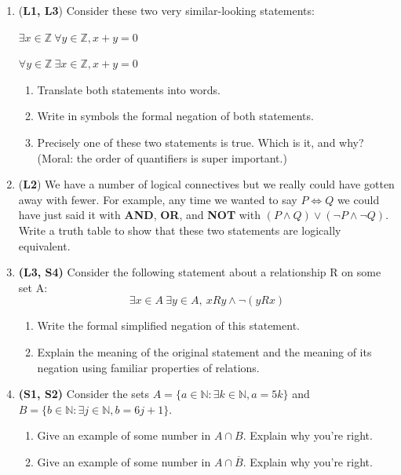 \documentclass[12pt]{article}
\begin{document}
\begin{enumerate}
\item (\textbf{L1, L3}) Consider these two very similar-looking statements: 

$\exists x\in \mathbb{Z}\ \forall y \in \mathbb{Z}, x + y = 0$

$\forall y \in \mathbb{Z}\ \exists x\in \mathbb{Z}, x + y = 0$

\begin{enumerate}
    \item Translate both statements into words.
    \item Write in symbols the formal negation of both statements.
    \item Precisely one of these two statements is true. Which is it, and why?\\ (Moral: the order of quantifiers is super important.)
\end{enumerate}

\item (\textbf{L2}) We have a number of logical connectives but we really could have gotten away with fewer. For example, any time we wanted to say $P \iff Q$ we could have just said it with \textbf{AND}, \textbf{OR}, and \textbf{NOT} with $(P \land Q) \lor ( \lnot P \land \lnot Q)$. Write a truth table to show that these two statements are logically equivalent.


\item
\textbf{(L3, S4)} Consider the following statement about a relationship R on some set A:
        \[\exists x \in A \ \exists y \in A,\ xRy \land \lnot (yRx) \]
\begin{enumerate}
    \item 
    Write the formal simplified negation of this statement.
    \item
    Explain the meaning of the original statement and the meaning of its negation using familiar properties of relations.
\end{enumerate}

\item \textbf{(S1, S2)} Consider the sets $A = \{a\in\mathbb{N}: \exists k\in\mathbb{N}, a = 5k\}$ and $B = \{b\in\mathbb{N}: \exists j\in\mathbb{N}, b = 6j+1\}$.
\begin{enumerate}
    \item Give an example of some number in $A\cap B$. Explain why you're right.
    \item Give an example of some number in $A\cap\overline{B}$. Explain why you're right.
\end{enumerate}


\end{enumerate}
\end{document}
